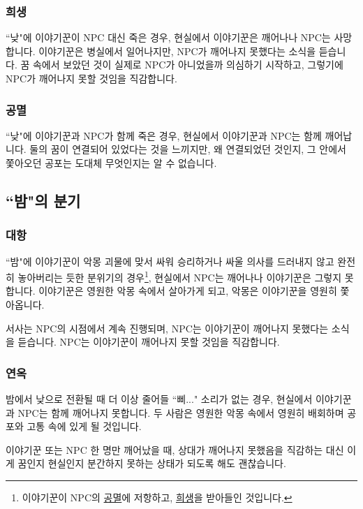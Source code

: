 \documentclass{report}
\begin{document}
			\subsubsection{희생}
			``낮"에 이야기꾼이 NPC 대신 죽은 경우, 현실에서 이야기꾼은 깨어나나 NPC는 사망합니다. 이야기꾼은 병실에서 일어나지만, NPC가 깨어나지 못했다는 소식을 듣습니다. 꿈 속에서 보았던 것이 실제로 NPC가 아니었을까 의심하기 시작하고, 그렇기에 NPC가 깨어나지 못할 것임을 직감합니다.
			
			\hypertarget{dream-corrupt}{}
			\subsubsection{공멸}
			``낮"에 이야기꾼과 NPC가 함께 죽은 경우, 현실에서 이야기꾼과 NPC는 함께 깨어납니다. 둘의 꿈이 연결되어 있었다는 것을 느끼지만, 왜 연결되었던 것인지, 그 안에서 쫓아오던 공포는 도대체 무엇인지는 알 수 없습니다.
		
		\subsection{``밤"의 분기}
			\hypertarget{dream-fight}{}
			\subsubsection{대항}
			``밤"에 이야기꾼이 악몽 괴물에 맞서 싸워 승리하거나 싸울 의사를 드러내지 않고 완전히 놓아버리는 듯한 분위기의 경우\footnote{이야기꾼이 NPC의 \hyperlink{dream-corrupt}{공멸}에 저항하고, \hyperlink{dream-sacrifice}{희생}을 받아들인 것입니다.}, 현실에서 NPC는 깨어나나 이야기꾼은 그렇지 못합니다. 이야기꾼은 영원한 악몽 속에서 살아가게 되고, 악몽은 이야기꾼을 영원히 쫓아옵니다.
			
			서사는 NPC의 시점에서 계속 진행되며, NPC는 이야기꾼이 깨어나지 못했다는 소식을 듣습니다. NPC는 이야기꾼이 깨어나지 못할 것임을 직감합니다.
			
			\hypertarget{dream-limbo}{}
			\subsubsection{연옥}
			밤에서 낮으로 전환될 때 더 이상 줄어들 ``삐..." 소리가 없는 경우, 현실에서 이야기꾼과 NPC는 함께 깨어나지 못합니다. 두 사람은 영원한 악몽 속에서 영원히 배회하며 공포와 고통 속에 있게 될 것입니다.
		
		\bigskip
		이야기꾼 또는 NPC 한 명만 깨어났을 때, 상대가 깨어나지 못했음을 직감하는 대신 이게 꿈인지 현실인지 분간하지 못하는 상태가 되도록 해도 괜찮습니다.
\end{document}
